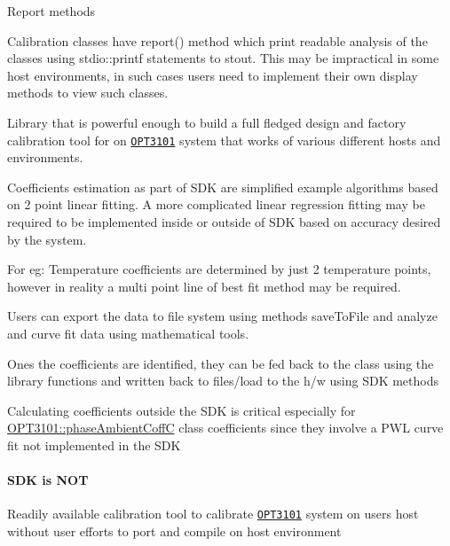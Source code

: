 \begin{DoxyItemize}
\begin{DoxyItemize}
\begin{DoxyItemize}
\end{DoxyItemize}
\item Report methods
\begin{DoxyItemize}
\item Calibration classes have report() method which print readable analysis of the classes using stdio\+::printf statements to stout. This may be impractical in some host environments, in such cases users need to implement their own display methods to view such classes.
\end{DoxyItemize}
\end{DoxyItemize}
\item Library that is powerful enough to build a full fledged design and factory calibration tool for on \href{http://www.ti.com/product/OPT3101}{\tt O\+P\+T3101} system that works of various different hosts and environments.
\item Coefficients estimation as part of S\+DK are simplified example algorithms based on 2 point linear fitting. A more complicated linear regression fitting may be required to be implemented inside or outside of S\+DK based on accuracy desired by the system.
\begin{DoxyItemize}
\item For eg\+: Temperature coefficients are determined by just 2 temperature points, however in reality a multi point line of best fit method may be required.
\item Users can export the data to file system using methods save\+To\+File and analyze and curve fit data using mathematical tools.
\item Ones the coefficients are identified, they can be fed back to the class using the library functions and written back to files/load to the h/w using S\+DK methods
\item Calculating coefficients outside the S\+DK is critical especially for \mbox{\hyperlink{class_o_p_t3101_1_1phase_ambient_coff_c}{O\+P\+T3101\+::phase\+Ambient\+CoffC}} class coefficients since they involve a P\+WL curve fit not implemented in the S\+DK
\end{DoxyItemize}
\end{DoxyItemize}

\paragraph*{S\+DK is {\bfseries N\+OT}}


\begin{DoxyItemize}
\item Readily available calibration tool to calibrate \href{http://www.ti.com/product/OPT3101}{\tt O\+P\+T3101} system on users\textquotesingle{} host without user efforts to port and compile on host environment
\end{DoxyItemize}





